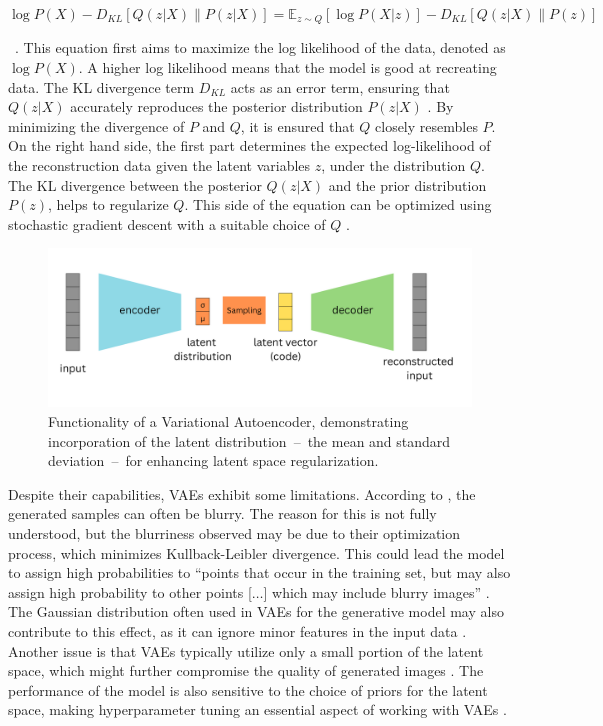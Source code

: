 \[
\log P(X) - D_{KL} \left[ Q(z|X) \parallel P(z|X) \right] = \mathbb{E}_{z \sim Q} \left[ \log P(X|z) \right] - D_{KL} \left[ Q(z|X) \parallel P(z) \right]
\]

~\citep{doerschVAE}.
This equation first aims to maximize the log likelihood of the data, denoted as \(\log P(X)\). A higher log likelihood means that the model is good at recreating data. The KL divergence term \(D_{KL} \) acts as an error term, ensuring that \(Q(z|X)\) accurately reproduces the posterior distribution \(P(z|X)\) \citep{doerschVAE}. By minimizing the divergence of \(P\) and \(Q\), it is ensured that \(Q\) closely resembles \(P\). On the right hand side, the first part determines the expected log-likelihood of the reconstruction data given the latent variables \(z\), under the distribution \(Q\). The KL divergence between the posterior \(Q(z|X)\) and the prior distribution \(P(z)\), helps to regularize \(Q\). This side of the equation can be optimized using stochastic gradient descent with a suitable choice of \(Q\) \citep{doerschVAE}. 

\begin{figure}[ht]
    \centering
      \hspace{.8cm}
      \includegraphics[width=.9\columnwidth]{figures/VAE.png}
      \caption{Functionality of a Variational Autoencoder, demonstrating incorporation of the latent distribution~--~the mean and standard deviation~--~for enhancing latent space regularization.}\label{fig:figureVAE}
\end{figure}

Despite their capabilities, VAEs exhibit some limitations. According to \citeauthor{GoodfellowDeepLearning}, the generated samples can often be blurry. The reason for this is not fully 
understood, but the blurriness observed may be due to their optimization process, which minimizes Kullback-Leibler divergence. This could lead the model to assign high probabilities to ``points that occur in the training set, but may also assign high probability to other points [\(\ldots\)] which may include blurry images'' \citep{GoodfellowDeepLearning}. The Gaussian distribution often used in VAEs for the generative model may also contribute to this effect, as it can ignore minor features in the input data \citep{GoodfellowDeepLearning}. Another issue is that VAEs typically utilize only a small portion of the latent space, which might further compromise the quality of generated images \citep{GoodfellowDeepLearning}. The performance of the model is also sensitive to the choice of priors for the latent space, making hyperparameter tuning an essential aspect of working with VAEs \citep{kingmaVAE, higginsVAE}. 

